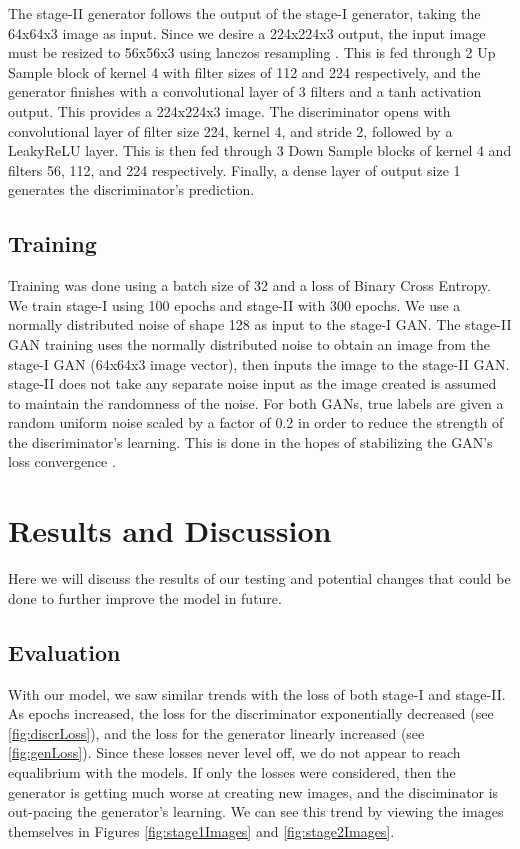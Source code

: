 \documentclass{article}
\begin{document}
	The stage-II generator follows the output of the stage-I generator, taking the 64x64x3 image as input. Since we desire a 224x224x3 output, the input image must be resized to 56x56x3 using lanczos resampling \cite{lanczos}. This is fed through 2 Up Sample block of kernel 4 with filter sizes of 112 and 224 respectively, and the generator finishes with a convolutional layer of 3 filters  and a tanh activation output. This provides a 224x224x3 image. The discriminator opens with convolutional layer of filter size 224, kernel 4, and stride 2, followed by a LeakyReLU layer. This is then fed through 3 Down Sample blocks of kernel 4 and filters 56, 112, and 224 respectively. Finally, a dense layer of output size 1 generates the discriminator’s prediction.

	\subsection{Training}
	Training was done using a batch size of 32 and a loss of Binary Cross Entropy. We train stage-I using 100 epochs and stage-II with 300 epochs. We use a normally distributed noise of shape 128 as input to the stage-I GAN. The stage-II GAN training uses the normally distributed noise to obtain an image from the stage-I GAN (64x64x3 image vector), then inputs the image to the stage-II GAN. stage-II does not take any separate noise input as the image created is assumed to maintain the randomness of the noise.  For both GANs, true labels are given a random uniform noise scaled by a factor of 0.2 in order to reduce the strength of the discriminator’s learning. This is done in the hopes of stabilizing the GAN’s loss convergence \cite{salimans2016improved}.
	\section{Results and Discussion}
	Here we will discuss the results of our testing and potential changes that could be done to further improve the model in future.

	\subsection{Evaluation}	
	\label{sub:eval}
	With our model, we saw similar trends with the loss of both stage-I and stage-II. As epochs increased, the loss for the discriminator exponentially decreased (see \ref{fig:discrLoss}), and the loss for the generator linearly increased (see \ref{fig:genLoss}). Since these losses never level off, we do not appear to reach equalibrium with the models. If only the losses were considered, then the generator is getting much worse at creating new images, and the disciminator is out-pacing the generator's learning. We can see this trend by viewing the images themselves in Figures \ref{fig:stage1Images} and \ref{fig:stage2Images}.
\end{document}
